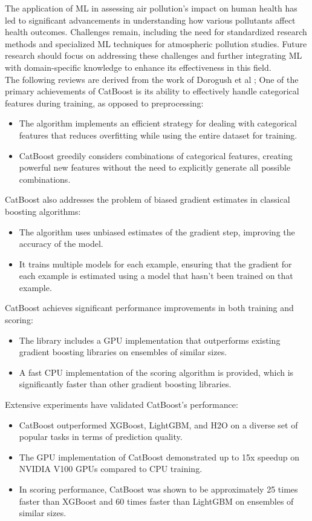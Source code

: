 \documentclass{book}
\numberwithin{equation}{section}
\numberwithin{figure}{section}
\begin{document}
The application of ML in assessing air pollution's impact on human health has led to significant advancements in understanding how various pollutants affect health outcomes. Challenges remain, including the need for standardized research methods and specialized ML techniques for atmospheric pollution studies. Future research should focus on addressing these challenges and further integrating ML with domain-specific knowledge to enhance its effectiveness in this field.\\
The following reviews are derived from the work of Dorogush et al \citep{dorogush2018catboost};
One of the primary achievements of CatBoost is its ability to effectively handle categorical features during training, as opposed to preprocessing:
\begin{itemize}
    \item The algorithm implements an efficient strategy for dealing with categorical features that reduces overfitting while using the entire dataset for training.
    \item CatBoost greedily considers combinations of categorical features, creating powerful new features without the need to explicitly generate all possible combinations.
\end{itemize}

CatBoost also addresses the problem of biased gradient estimates in classical boosting algorithms:
\begin{itemize}
    \item The algorithm uses unbiased estimates of the gradient step, improving the accuracy of the model.
    \item It trains multiple models for each example, ensuring that the gradient for each example is estimated using a model that hasn't been trained on that example.
\end{itemize}

CatBoost achieves significant performance improvements in both training and scoring:
\begin{itemize}
    \item The library includes a GPU implementation that outperforms existing gradient boosting libraries on ensembles of similar sizes.
    \item A fast CPU implementation of the scoring algorithm is provided, which is significantly faster than other gradient boosting libraries.
\end{itemize}

Extensive experiments have validated CatBoost's performance:
\begin{itemize}
    \item CatBoost outperformed XGBoost, LightGBM, and H2O on a diverse set of popular tasks in terms of prediction quality.
    \item The GPU implementation of CatBoost demonstrated up to 15x speedup on NVIDIA V100 GPUs compared to CPU training.
    \item In scoring performance, CatBoost was shown to be approximately 25 times faster than XGBoost and 60 times faster than LightGBM on ensembles of similar sizes.
\end{itemize}
\end{document}

